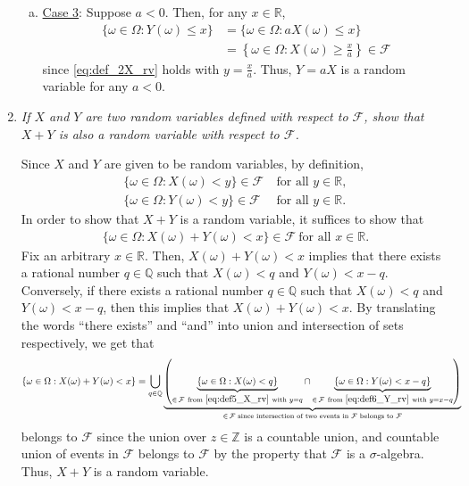 \documentclass[11pt]{article}
\begin{document}
\begin{enumerate}
\begin{enumerate}[(a)]
	\item \underline{Case 3}: Suppose $a<0$. Then, for any $x\in \mathbb{R}$,
	\begin{align}
	\{\omega\in \Omega:Y(\omega)\leq x\}&=\{\omega\in \Omega:aX(\omega)\leq x\}\nonumber\\
	&=\left\lbrace\omega\in\Omega: X(\omega)\geq \frac{x}{a}\right\rbrace\in \mathcal{F}
	\end{align}
	since \eqref{eq:def_2X_rv} holds with $y=\frac{x}{a}$. Thus, $Y=aX$ is a random variable for any $a<0$.\\
\end{enumerate}


\item \emph{If $X$ and $Y$ are two random variables defined with respect to $\mathcal{F}$, show that $X+Y$ is also a random variable with respect to $\mathcal{F}$.}

\par Since $X$ and $Y$ are given to be random variables, by definition,
\begin{align}
\{\omega\in \Omega:X(\omega)< y\}\in \mathcal{F}~&\text{for all }y\in \mathbb{R},\label{eq:def5_X_rv}\\
\{\omega\in \Omega:Y(\omega)< y\}\in \mathcal{F}~&\text{for all }y\in \mathbb{R}.\label{eq:def6_Y_rv}
\end{align}
In order to show that $X+Y$ is a random variable, it suffices to show that
\begin{eqnarray}
\{\omega\in \Omega:X(\omega)+Y(\omega)< x\}\in \mathcal{F}~\text{for all }x\in \mathbb{R}.\label{eq:def_X+Y_rv}
\end{eqnarray}
Fix an arbitrary $x\in \mathbb{R}$. Then, $X(\omega)+Y(\omega)< x$ implies that there exists a rational number $q\in \mathbb{Q}$ such that $X(\omega) < q$ and $Y(\omega) < x-q$. Conversely, if there exists a rational number $q\in \mathbb{Q}$ such that $X(\omega)< q$ and $Y(\omega)< x-q$, then this implies that $X(\omega)+Y(\omega)< x$. By translating the words ``there exists'' and ``and'' into union and intersection of sets respectively, we get that
\begin{align}
\{\omega\in \Omega:X(\omega)+Y(\omega)< x\}&=\bigcup\limits_{q\in \mathbb{Q}}\underbrace{\left(\underbrace{\{\omega\in \Omega:X(\omega)<q\}}_{\in\, \mathcal{F}~\text{from }\eqref{eq:def5_X_rv}~\text{with } y=q} \cap \underbrace{\{\omega\in \Omega:Y(\omega)< x-q\}}_{\in\, \mathcal{F}~\text{from }\eqref{eq:def6_Y_rv}~\text{with } y=x-q}\right)}_{\in\, \mathcal{F}\text{ since intersection of two events in }\mathcal{F}\text{ belongs to }\mathcal{F}}\nonumber
\end{align}
belongs to $\mathcal{F}$ since the union over $z\in \mathbb{Z}$ is a countable union, and countable union of events in $\mathcal{F}$ belongs to $\mathcal{F}$ by the property that $\mathcal{F}$ is a $\sigma$-algebra. Thus, $X+Y$ is a random variable.\\


\end{enumerate}
\end{document}
